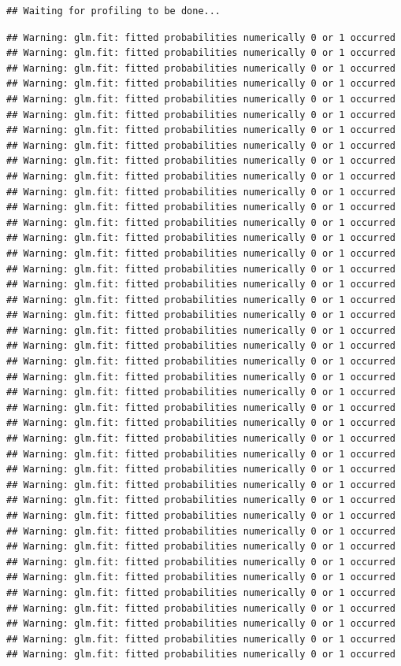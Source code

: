 \documentclass[
]{article}
\begin{document}
\begin{verbatim}
## Waiting for profiling to be done...
\end{verbatim}

\begin{verbatim}
## Warning: glm.fit: fitted probabilities numerically 0 or 1 occurred
## Warning: glm.fit: fitted probabilities numerically 0 or 1 occurred
## Warning: glm.fit: fitted probabilities numerically 0 or 1 occurred
## Warning: glm.fit: fitted probabilities numerically 0 or 1 occurred
## Warning: glm.fit: fitted probabilities numerically 0 or 1 occurred
## Warning: glm.fit: fitted probabilities numerically 0 or 1 occurred
## Warning: glm.fit: fitted probabilities numerically 0 or 1 occurred
## Warning: glm.fit: fitted probabilities numerically 0 or 1 occurred
## Warning: glm.fit: fitted probabilities numerically 0 or 1 occurred
## Warning: glm.fit: fitted probabilities numerically 0 or 1 occurred
## Warning: glm.fit: fitted probabilities numerically 0 or 1 occurred
## Warning: glm.fit: fitted probabilities numerically 0 or 1 occurred
## Warning: glm.fit: fitted probabilities numerically 0 or 1 occurred
## Warning: glm.fit: fitted probabilities numerically 0 or 1 occurred
## Warning: glm.fit: fitted probabilities numerically 0 or 1 occurred
## Warning: glm.fit: fitted probabilities numerically 0 or 1 occurred
## Warning: glm.fit: fitted probabilities numerically 0 or 1 occurred
## Warning: glm.fit: fitted probabilities numerically 0 or 1 occurred
## Warning: glm.fit: fitted probabilities numerically 0 or 1 occurred
## Warning: glm.fit: fitted probabilities numerically 0 or 1 occurred
## Warning: glm.fit: fitted probabilities numerically 0 or 1 occurred
## Warning: glm.fit: fitted probabilities numerically 0 or 1 occurred
## Warning: glm.fit: fitted probabilities numerically 0 or 1 occurred
## Warning: glm.fit: fitted probabilities numerically 0 or 1 occurred
## Warning: glm.fit: fitted probabilities numerically 0 or 1 occurred
## Warning: glm.fit: fitted probabilities numerically 0 or 1 occurred
## Warning: glm.fit: fitted probabilities numerically 0 or 1 occurred
## Warning: glm.fit: fitted probabilities numerically 0 or 1 occurred
## Warning: glm.fit: fitted probabilities numerically 0 or 1 occurred
## Warning: glm.fit: fitted probabilities numerically 0 or 1 occurred
## Warning: glm.fit: fitted probabilities numerically 0 or 1 occurred
## Warning: glm.fit: fitted probabilities numerically 0 or 1 occurred
## Warning: glm.fit: fitted probabilities numerically 0 or 1 occurred
## Warning: glm.fit: fitted probabilities numerically 0 or 1 occurred
## Warning: glm.fit: fitted probabilities numerically 0 or 1 occurred
## Warning: glm.fit: fitted probabilities numerically 0 or 1 occurred
## Warning: glm.fit: fitted probabilities numerically 0 or 1 occurred
## Warning: glm.fit: fitted probabilities numerically 0 or 1 occurred
## Warning: glm.fit: fitted probabilities numerically 0 or 1 occurred
## Warning: glm.fit: fitted probabilities numerically 0 or 1 occurred
## Warning: glm.fit: fitted probabilities numerically 0 or 1 occurred
\end{verbatim}
\end{document}
